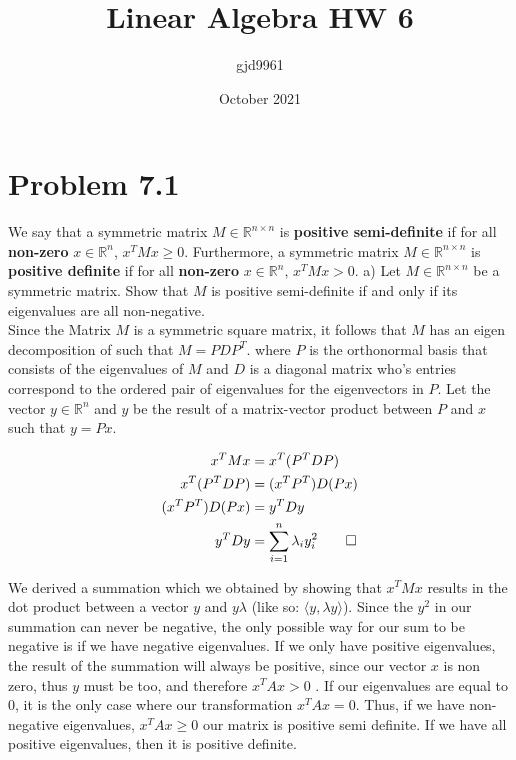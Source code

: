\documentclass[12pt,twoside]{article}
\title{Linear Algebra HW 6}
\author{gjd9961}
\date{October 2021}
\newcommand{\R}{\mathbb{R}}
\begin{document}
\maketitle

\section{Problem 7.1}
	We say that a symmetric matrix $M \in \R^{n \times n}$ is \textbf{positive semi-definite} if for all \textbf{non-zero} $x \in \R^n$, $
	x^T M x \geq 0$. Furthermore, a symmetric matrix $M \in \R^{n \times n}$ is \textbf{positive definite} if for all \textbf{non-zero} $x \in \R^n$, $
	x^T M x > 0$.
a) Let $M \in \R^{n \times n}$ be a symmetric matrix. Show that $M$ is positive semi-definite if and only if its eigenvalues are all non-negative. \\

Since the Matrix $M$ is a symmetric square matrix, it follows that $M$ has an eigen decomposition of such that $M = PDP^T$. where $P$ is the orthonormal basis that consists of the eigenvalues of $M$ and $D$ is a diagonal matrix who's entries correspond to the ordered pair of eigenvalues for the eigenvectors in $P$. Let the vector $y \in \R^n$ and $y$ be the result of a matrix-vector product between $P$ and $x$ such that $y=Px$.

\begin{equation}
    \begin{split}
        x^TMx&= x^T(P^TDP) \\
        x^T(P^TDP)&=(x^TP^T)D(Px) \\
        (x^TP^T)D(Px)&=y^TDy \\
        y^TDy&=\sum_{i=1}^n\lambda_iy^2_i \qed
    \end{split}
\end{equation}

We derived a summation which we obtained by showing that $x^TMx$ results in the dot product between a vector $y$ and $y\lambda$ (like so: $\langle y, \lambda y \rangle $). Since the $y^2$ in our summation can never be negative, the only possible way for our sum to be negative is if we have negative eigenvalues. If we only have positive eigenvalues, the result of the summation will always be positive, since our vector $x$ is non zero, thus $y$ must be too, and therefore $x^TAx>0$ . If our eigenvalues are equal to 0, it is the only case where our transformation $x^TAx=0$. Thus, if we have non-negative eigenvalues, $x^TAx \geq 0$ our matrix is positive semi definite. If we have all positive eigenvalues, then it is positive definite. \\
\end{document}
